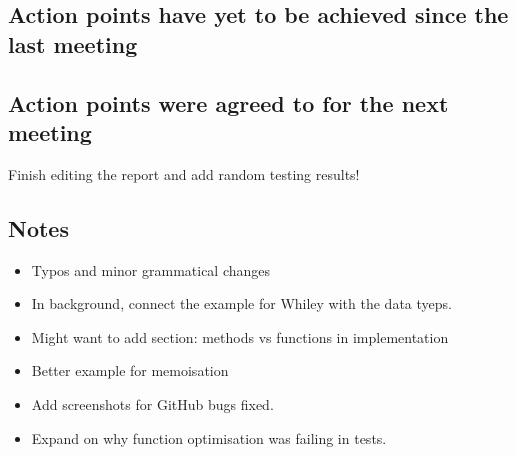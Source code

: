 \documentclass[]{article}
\begin{document}
	\subsection{Action points have yet to be achieved since the last meeting}
	\subsection{Action points were agreed to for the next meeting}
	Finish editing the report and add random testing results!
	
	\subsection{Notes}
	\begin{itemize}
		\item Typos and minor grammatical changes
		\item In background, connect the example for Whiley with the data tyeps.
		\item Might want to add section: methods vs functions in implementation
		\item Better example for memoisation
		\item Add screenshots for GitHub bugs fixed.
		\item Expand on why function optimisation was failing in tests.
	\end{itemize}

%
%
\end{document}
